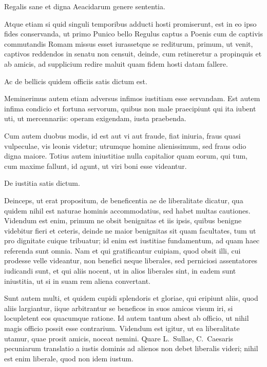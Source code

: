 Regalis sane et digna Aeacidarum genere sententia.
 

 Atque etiam si quid singuli temporibus adducti hosti promiserunt, est in eo ipso fides conservanda, ut primo Punico bello Regulus captus a Poenis cum de captivis commutandis Romam missus esset iurassetque se rediturum, primum, ut venit, captivos reddendos in senatu non censuit, deinde, cum retineretur a propinquis et ab amicis, ad supplicium redire maluit quam fidem hosti datam fallere.

 Ac de bellicis quidem officiis satis dictum est.

Meminerimus autem etiam adversus infimos iustitiam esse servandam. Est autem infima condicio et fortuna servorum, quibus non male praecipiunt qui ita iubent uti, ut mercennariis: operam exigendam, iusta praebenda.

Cum autem duobus modis, id est aut vi aut fraude, fiat iniuria, fraus quasi vulpeculae, vis leonis videtur; utrumque homine alienissimum, sed fraus odio digna maiore. Totius autem iniustitiae nulla capitalior quam eorum, qui tum, cum maxime fallunt, id agunt, ut viri boni esse videantur.

De iustitia satis dictum.
 

 Deinceps, ut erat propositum, de beneficentia ae de liberalitate dicatur, qua quidem nihil est naturae hominis accommodatius, sed habet multas cautiones. Videndum est enim, primum ne obsit benignitas et iis ipsis, quibus benigne videbitur fieri et ceteris, deinde ne maior benignitas sit quam facultates, tum ut pro dignitate cuique tribuatur; id enim est iustitiae fundamentum, ad quam haec referenda sunt omnia. Nam et qui gratificantur cuipiam, quod obsit illi, cui prodesse velle videantur, non benefici neque liberales, sed perniciosi assentatores iudicandi sunt, et qui aliis nocent, ut in alios liberales sint, in eadem sunt iniustitia, ut si in suam rem aliena convertant.

 

 Sunt autem multi, et quidem cupidi splendoris et gloriae, qui eripiunt aliis, quod aliis largiantur, iique arbitrantur se beneficos in suos amicos visum iri, si locupletent eos quacumque ratione. Id autem tantum abest ab officio, ut nihil magis officio possit esse contrarium. Videndum est igitur, ut ea liberalitate utamur, quae prosit amicis, noceat nemini. Quare L.~Sullae, C.~Caesaris pecuniarum translatio a iustis dominis ad alienos non debet liberalis videri; nihil est enim liberale, quod non idem iustum.

